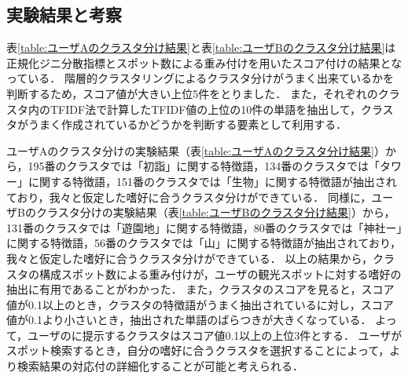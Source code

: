 \documentclass{deimj}
\begin{document}
\subsection{実験結果と考察}
表\ref{table:ユーザAのクラスタ分け結果}と表\ref{table:ユーザBのクラスタ分け結果}は正規化ジニ分散指標とスポット数による重み付けを用いたスコア付けの結果となっている．
階層的クラスタリングによるクラスタ分けがうまく出来ているかを判断するため，スコア値が大きい上位5件をとりました．
また，それぞれのクラスタ内のTFIDF法で計算したTFIDF値の上位の10件の単語を抽出して，クラスタがうまく作成されているかどうかを判断する要素として利用する．

ユーザAのクラスタ分けの実験結果（表\ref{table:ユーザAのクラスタ分け結果}）から，195番のクラスタでは「初詣」に関する特徴語，134番のクラスタでは「タワー」に関する特徴語，151番のクラスタでは「生物」に関する特徴語が抽出されており，我々と仮定した嗜好に合うクラスタ分けができている．
同様に，ユーザBのクラスタ分けの実験結果（表\ref{table:ユーザBのクラスタ分け結果}）から，131番のクラスタでは「遊園地」に関する特徴語，80番のクラスタでは「神社ー」に関する特徴語，56番のクラスタでは「山」に関する特徴語が抽出されており，我々と仮定した嗜好に合うクラスタ分けができている．
以上の結果から，クラスタの構成スポット数による重み付けが，ユーザの観光スポットに対する嗜好の抽出に有用であることがわかった．
また，クラスタのスコアを見ると，スコア値が0.1以上のとき，クラスタの特徴語がうまく抽出されているに対し，スコア値が0.1より小さいとき，抽出された単語のばらつきが大きくなっている．
よって，ユーザのに提示するクラスタはスコア値0.1以上の上位3件とする．
ユーザがスポット検索するとき，自分の嗜好に合うクラスタを選択することによって，より検索結果の対応付の詳細化することが可能と考えられる．


\end{document}
